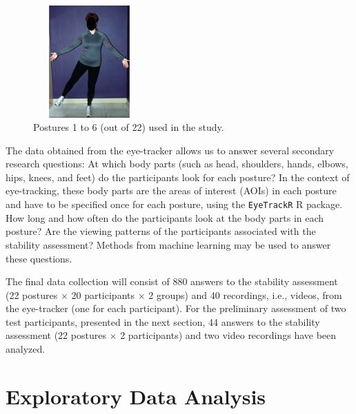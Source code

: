 \documentclass[11pt]{asaproc}
\begin{document}
\begin{figure}[t]
\begin{center}
\includegraphics[height=4.3cm,width=4.3cm]{figures/Posture6.jpg} \hspace{1pt}	
\end{center} 
\caption{\label{SixPostures}Postures 1 to 6 (out of 22) used in the study.}
\end{figure}


The data obtained from the eye-tracker allows us to answer several
secondary research questions: At which body parts (such as head, shoulders, hands, elbows, hips, knees, and feet)
do the participants look for each posture? In the context of eye-tracking, these body parts
are the areas of interest (AOIs) in each posture and have to be specified
once for each posture, using the {\tt EyeTrackR} R package.
How long and how often do the participants look at the body parts in each posture?
Are the viewing patterns of the participants associated with the stability assessment?
Methods from machine learning may be used to answer these questions.

The final data collection will consist of 
880 answers to the stability assessment (22 postures $\times$ 20 participants $\times$ 2 groups)
and 40 recordings, i.e., videos, from the eye-tracker (one for each participant).
For the preliminary assessment of two test participants, presented in the next section,
44 answers to the stability assessment (22 postures $\times$ 2 participants)
and two video recordings have been analyzed.


\section{Exploratory Data Analysis}  
\label{EDA}
\end{document}
